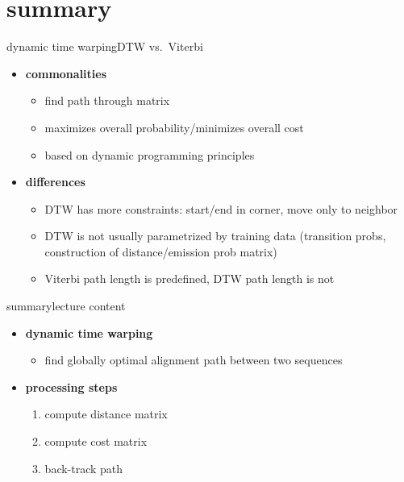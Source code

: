     
    \section{summary}
        \begin{frame}{dynamic time warping}{DTW vs.\ Viterbi}
              
                \bigskip
                \begin{itemize}
                    \item   \textbf{commonalities}
                        \begin{itemize}
                            \item   find path through matrix 
                            \item   maximizes overall probability/minimizes overall cost
                            \item   based on dynamic programming principles
                        \end{itemize}
                    \smallskip
                    \item   \textbf{differences}
                        \begin{itemize}
                            \item   DTW has more constraints: start/end in corner, move only to neighbor
                            \item   DTW is not usually parametrized by training data (transition probs, construction of distance/emission prob matrix)
                            \item   Viterbi path length is predefined, DTW path length is not
                        \end{itemize}
                \end{itemize}
        \end{frame}
        \begin{frame}{summary}{lecture content}
            \begin{itemize}
                \item   \textbf{dynamic time warping}
                    \begin{itemize}
                        \item   find globally optimal alignment path between two sequences
                    \end{itemize}
                \bigskip
                \item   \textbf{processing steps}
                    \begin{enumerate}
                        \item   compute distance matrix
                        \item   compute cost matrix
                        \item   back-track path
                    \end{enumerate}
            \end{itemize}
        \end{frame}

